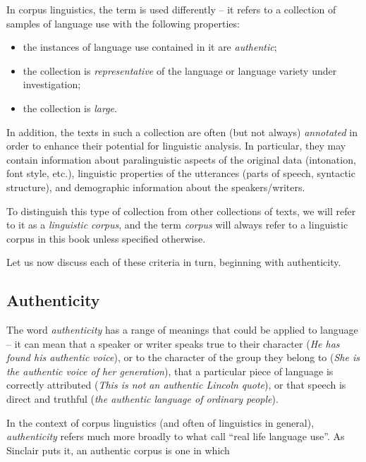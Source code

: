 In corpus linguistics, the term is used differently -- it refers to a collection of samples  of language use with the following properties:

\begin{itemize}
\item the instances of language use contained in it are  \emph{authentic};
\item the collection is \emph{representative}  of the language or language variety  under investigation;
\item the collection is  \emph{large}.
\end{itemize}

In addition, the texts in such a collection are often (but not always) \emph{annotated}  in order to enhance their potential for linguistic analysis. In particular, they may contain information about paralinguistic  aspects of the original data (intonation,  font style, etc.), linguistic properties of the utterances (parts of speech, syntactic  structure), and demographic  information about the speakers\slash writers.

To distinguish this type of collection from other collections of texts, we will refer to it as a \emph{linguistic corpus}, and the term \emph{corpus} will always refer to a linguistic corpus in this book unless specified otherwise.

Let us now discuss each of these criteria in turn, beginning with  authenticity.

\subsection{Authenticity}
\label{sec:authenticity}

The word \emph{authenticity}  has a range of meanings  that could be applied to language -- it can mean that a speaker or writer speaks true to their character (\textit{He has found his authentic voice}), or to the character of the group they belong to (\textit{She is the authentic voice of her generation}), that a particular piece of language is correctly attributed (\textit{This is not an authentic Lincoln quote}), or that speech is direct and truthful (\textit{the authentic language of ordinary people}).

In the context of corpus linguistics (and often of linguistics in general), \emph{authenticity}  refers much more broadly to what \citet{mcenery_corpus_2001} call ``real life language use''. As Sinclair puts it, an authentic  corpus is one in which

